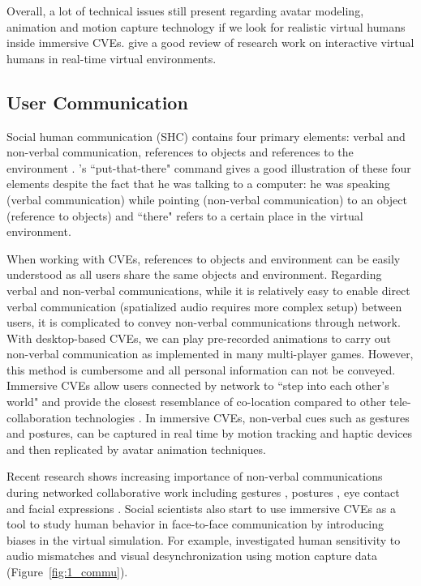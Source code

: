 Overall, a lot of technical issues still present regarding avatar modeling, animation and motion capture technology if we look for realistic virtual humans inside immersive CVEs. \citet{Magnenat2006Interactive} give a good review of research work on interactive virtual humans in real-time virtual environments.


\subsection{User Communication}
\label{sec:user-com}
Social human communication (SHC) contains four primary elements: verbal and non-verbal communication, references to objects and references to the environment \citep{Burgoon1994Human}. \citet{Bolt1980Put}'s ``put-that-there" command gives a good illustration of these four elements despite the fact that he was talking to a computer: he was speaking (verbal communication) while pointing (non-verbal communication) to an object (reference to objects) and ``there" refers to a certain place in the virtual environment. 

When working with CVEs, references to objects and environment can be easily understood as all users share the same objects and environment. Regarding verbal and non-verbal communications, while it is relatively easy to enable direct verbal communication (spatialized audio requires more complex setup) between users, it is complicated to convey non-verbal communications through network. With desktop-based CVEs, we can play pre-recorded animations to carry out non-verbal communication as implemented in many multi-player games. However, this method is cumbersome and all personal information can not be conveyed. Immersive CVEs allow users connected by network to ``step into each other's world" and provide the closest resemblance of co-location compared to other tele-collaboration technologies \citep{Wolff2007Review}. In immersive CVEs, non-verbal cues such as gestures and postures, can be captured in real time by motion tracking and haptic devices and then replicated by avatar animation techniques.

Recent research shows increasing importance of non-verbal communications during networked collaborative work \citep{Guye1999Nonverbal, Roberts2004SSH} including gestures \citep{Dodds2011Talk}, postures \citep{Normand2012Full}, eye contact \citep{Bailenson2002Gaze, Garau2003Impact} and facial expressions \citep{Boker2009Effects}. Social scientists also start to use immersive CVEs as a tool to study human behavior in face-to-face communication by introducing biases in the virtual simulation. For example, \citet{Ennis2010Seeing} investigated human sensitivity to audio mismatches and visual desynchronization using motion capture data (Figure~\ref{fig:1_commu}). 

